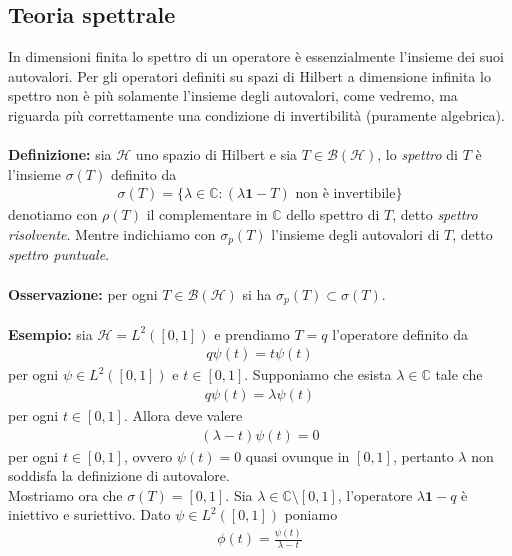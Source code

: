 \documentclass{article}
\numberwithin{equation}{subsection}
\begin{document}
\subsection{Teoria spettrale}
In dimensioni finita lo spettro di un operatore è essenzialmente l'insieme dei suoi autovalori. Per gli operatori definiti su spazi di Hilbert a dimensione infinita lo spettro non è più solamente l'insieme degli autovalori, come vedremo, ma riguarda più correttamente una condizione di invertibilità (puramente algebrica). \\ \\
\textbf{Definizione:} sia $\mathcal{H}$ uno spazio di Hilbert e sia $T \in \mathcal{B}(\mathcal{H})$, lo \textit{spettro} di $T$ è l'insieme $\sigma(T)$ definito da 
\begin{align*}
    \sigma(T) = \{\lambda \in \mathbb{C} : (\lambda\mathbf{1} - T) \text{ non è invertibile}\} 
\end{align*}
denotiamo con $\rho(T)$ il complementare in $\mathbb{C}$ dello spettro di $T$, detto \textit{spettro risolvente}. Mentre indichiamo con $\sigma_p(T)$ l'insieme degli autovalori di $T$, detto \textit{spettro puntuale}. \\ \\
\textbf{Osservazione:} per ogni $T \in \mathcal{B}(\mathcal{H})$ si ha $\sigma_p(T) \subset \sigma(T)$. \\ \\
\textbf{Esempio:} sia $\mathcal{H} = L^2([0, 1])$ e prendiamo $T = q$ l'operatore definito da 
\begin{align*}
    q\psi(t) = t\psi(t) 
\end{align*}
per ogni $\psi \in L^2([0, 1])$ e $t \in [0, 1]$. Supponiamo che esista $\lambda \in \mathbb{C}$ tale che 
\begin{align*}
    q\psi(t) = \lambda\psi(t) 
\end{align*}
per ogni $t \in [0, 1]$. Allora deve valere 
\begin{align*}
    (\lambda - t)\psi(t) = 0 
\end{align*}
per ogni $t \in [0, 1]$, ovvero $\psi(t) = 0$ quasi ovunque in $[0, 1]$, pertanto $\lambda$ non soddisfa la definizione di autovalore. \\
Mostriamo ora che $\sigma(T) = [0, 1]$. Sia $\lambda \in \mathbb{C} \setminus [0, 1]$, l'operatore $\lambda\mathbf{1} - q$ è iniettivo e suriettivo. Dato $\psi \in L^2([0, 1])$ poniamo 
\begin{align*}
    \phi(t) = \frac{\psi(t)}{\lambda - t} 
\end{align*}
\end{document}
